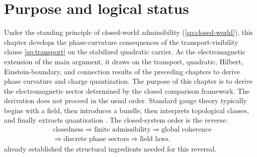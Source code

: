 \section{Purpose and logical status}
\label{sec:em-purpose}
Under the standing principle of closed-world admissibility
(\cref{sp:closed-world}), this chapter develops the phase-curvature
consequences of the transport-visibility clause
\cref{sp:transport} on the stabilized quadratic carrier.
As the electromagnetic extension of the main argument, it draws on the
transport, quadratic, Hilbert, Einstein-boundary, and connection results
of the preceding chapters to derive phase curvature and charge
quantization.
The purpose of this chapter is to derive the electromagnetic sector
determined by the closed comparison framework.
The derivation does not proceed in the usual order.
Standard gauge theory typically begins with a field, then introduces a
bundle, then interprets topological classes, and finally extracts
quantization \cite{Nakahara2003}.
The closed-system order is the reverse:
\[
	\begin{aligned}
		 & \text{closedness}
		\Longrightarrow
		\text{finite admissibility}
		\Longrightarrow
		\text{global coherence}
		\\
		 & \Longrightarrow
		\text{discrete phase sectors}
		\Longrightarrow
		\text{field laws}.
	\end{aligned}
\]
already established the structural ingredients
needed for this reversal.
